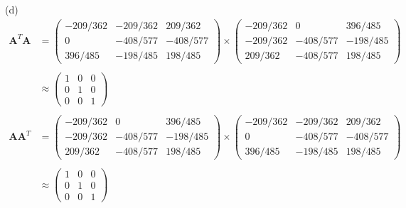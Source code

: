 \documentclass[12pt,letterpaper,fleqn]{article}
\theoremstyle{definition}
\begin{document}
\newpage
(d) 
\begin{equation*}
\begin{split}
\textbf{A}^{T}\textbf{A} &=
\begin{pmatrix}
-209/362 &-209/362 &209/362\\
0 &-408/577 &-408/577\\
396/485 &-198/485 &198/485
\end{pmatrix} \times
\begin{pmatrix}
-209/362 &0 &396/485\\
-209/362 &-408/577 &-198/485\\
209/362 &-408/577 &198/485
\end{pmatrix}\\
\\
&\approx \begin{pmatrix}
1 &0 &0\\
0 &1 &0\\
0 &0 &1
\end{pmatrix}\\
\\
\textbf{A}\textbf{A}^{T} &=
\begin{pmatrix}
-209/362 &0 &396/485\\
-209/362 &-408/577 &-198/485\\
209/362 &-408/577 &198/485
\end{pmatrix} \times
\begin{pmatrix}
-209/362 &-209/362 &209/362\\
0 &-408/577 &-408/577\\
396/485 &-198/485 &198/485
\end{pmatrix}\\
\\
&\approx \begin{pmatrix}
1 &0 &0\\
0 &1 &0\\
0 &0 &1
\end{pmatrix}
\end{split}
\end{equation*}
\end{document}

